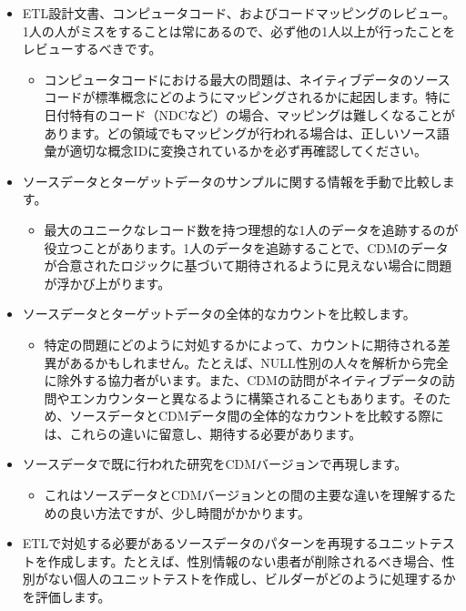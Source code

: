\documentclass[
  11pt]{book}
\providecommand{\tightlist}{%
  \setlength{\itemsep}{0pt}\setlength{\parskip}{0pt}}
\theoremstyle{definition}
\theoremstyle{definition}
\theoremstyle{definition}
\theoremstyle{definition}
\theoremstyle{remark}
\begin{document}
\begin{itemize}
\tightlist
\item
  ETL設計文書、コンピュータコード、およびコードマッピングのレビュー。1人の人がミスをすることは常にあるので、必ず他の1人以上が行ったことをレビューするべきです。

  \begin{itemize}
  \tightlist
  \item
    コンピュータコードにおける最大の問題は、ネイティブデータのソースコードが標準概念にどのようにマッピングされるかに起因します。特に日付特有のコード（NDCなど）の場合、マッピングは難しくなることがあります。どの領域でもマッピングが行われる場合は、正しいソース語彙が適切な概念IDに変換されているかを必ず再確認してください。
  \end{itemize}
\item
  ソースデータとターゲットデータのサンプルに関する情報を手動で比較します。

  \begin{itemize}
  \tightlist
  \item
    最大のユニークなレコード数を持つ理想的な1人のデータを追跡するのが役立つことがあります。1人のデータを追跡することで、CDMのデータが合意されたロジックに基づいて期待されるように見えない場合に問題が浮かび上がります。
  \end{itemize}
\item
  ソースデータとターゲットデータの全体的なカウントを比較します。

  \begin{itemize}
  \tightlist
  \item
    特定の問題にどのように対処するかによって、カウントに期待される差異があるかもしれません。たとえば、NULL性別の人々を解析から完全に除外する協力者がいます。また、CDMの訪問がネイティブデータの訪問やエンカウンターと異なるように構築されることもあります。そのため、ソースデータとCDMデータ間の全体的なカウントを比較する際には、これらの違いに留意し、期待する必要があります。
  \end{itemize}
\item
  ソースデータで既に行われた研究をCDMバージョンで再現します。

  \begin{itemize}
  \tightlist
  \item
    これはソースデータとCDMバージョンとの間の主要な違いを理解するための良い方法ですが、少し時間がかかります。
  \end{itemize}
\item
  ETLで対処する必要があるソースデータのパターンを再現するユニットテストを作成します。たとえば、性別情報のない患者が削除されるべき場合、性別がない個人のユニットテストを作成し、ビルダーがどのように処理するかを評価します。


\end{itemize}
\end{document}
